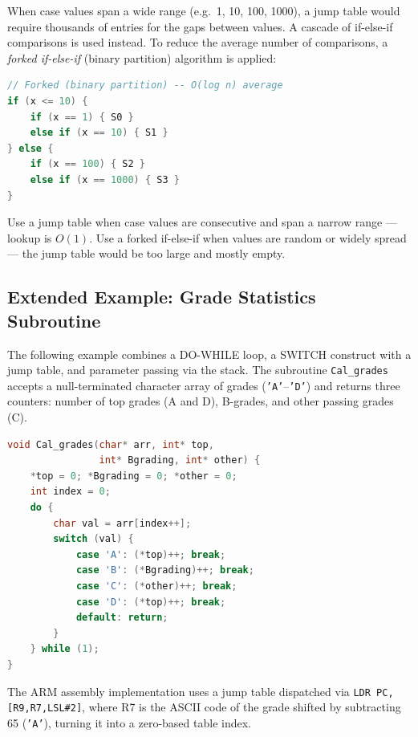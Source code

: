 \documentclass[11pt, a4paper, notitlepage]{report}
\theoremstyle{definition}
\theoremstyle{remark}
\theoremstyle{definition}
\begin{document}
When case values span a wide range (e.g.\ 1, 10, 100, 1000), a jump table would require thousands of entries for the gaps between values. A cascade of if-else-if comparisons is used instead. To reduce the average number of comparisons, a \emph{forked if-else-if} (binary partition) algorithm is applied:

\begin{lstlisting}[language=C]
// Forked (binary partition) -- O(log n) average
if (x <= 10) {
    if (x == 1) { S0 }
    else if (x == 10) { S1 }
} else {
    if (x == 100) { S2 }
    else if (x == 1000) { S3 }
}
\end{lstlisting}

\begin{examtip}[title={Choosing Between Jump Table and Forked if-else-if}]
Use a jump table when case values are consecutive and span a narrow range --- lookup is $O(1)$. Use a forked if-else-if when values are random or widely spread --- the jump table would be too large and mostly empty.
\end{examtip}

\subsection{Extended Example: Grade Statistics Subroutine}

The following example combines a DO-WHILE loop, a SWITCH construct with a jump table, and parameter passing via the stack. The subroutine \texttt{Cal\_grades} accepts a null-terminated character array of grades (\texttt{'A'}--\texttt{'D'}) and returns three counters: number of top grades (A and D), B-grades, and other passing grades (C).

\begin{lstlisting}[language=C]
void Cal_grades(char* arr, int* top,
                int* Bgrading, int* other) {
    *top = 0; *Bgrading = 0; *other = 0;
    int index = 0;
    do {
        char val = arr[index++];
        switch (val) {
            case 'A': (*top)++; break;
            case 'B': (*Bgrading)++; break;
            case 'C': (*other)++; break;
            case 'D': (*top)++; break;
            default: return;
        }
    } while (1);
}
\end{lstlisting}

The ARM assembly implementation uses a jump table dispatched via \texttt{LDR PC,[R9,R7,LSL\#2]}, where R7 is the ASCII code of the grade shifted by subtracting 65 (\texttt{'A'}), turning it into a zero-based table index.
\end{document}
